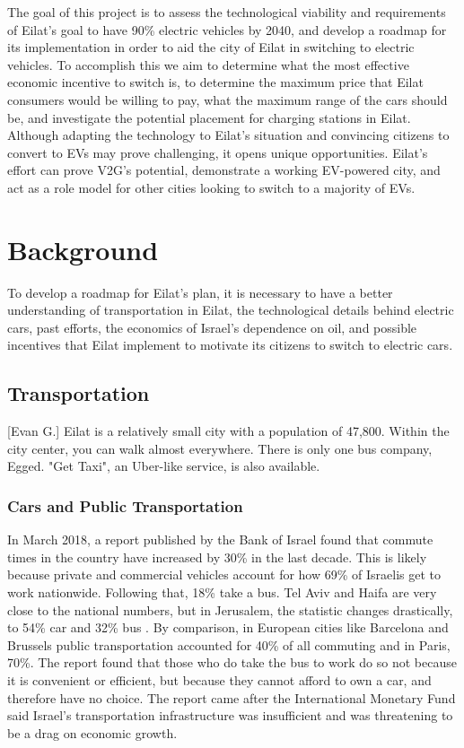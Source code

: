 \documentclass{article}                         %
\begin{document}
The goal of this project is to assess the technological viability and requirements of Eilat's goal to have 90\% electric vehicles by 2040, and develop a roadmap for its implementation in order to aid the city of Eilat in switching to electric vehicles. To accomplish this we aim to determine what the most effective economic incentive to switch is, to determine the maximum price that Eilat consumers would be willing to pay, what the maximum range of the cars should be, and investigate the potential placement for charging stations in Eilat. Although adapting the technology to Eilat's situation and convincing citizens to convert to EVs may prove challenging, it opens unique opportunities. Eilat's effort can prove V2G's potential, demonstrate a working EV-powered city, and act as a role model for other cities looking to switch to a majority of EVs.

\newpage
\section{Background}
To develop a roadmap for Eilat's plan, it is necessary to have a better understanding of transportation in Eilat, the technological details behind electric cars, past efforts, the economics of Israel's dependence on oil, and possible incentives that Eilat implement to motivate its citizens to switch to electric cars.

\subsection{Transportation}[Evan G.]
Eilat is a relatively small city with a population of 47,800. Within the city center, you can walk almost everywhere. There is only one bus company, Egged. \cite{TransportationEilat} "Get Taxi", an Uber-like service, is also available. 

\subsubsection{Cars and Public Transportation}
In March 2018, a report published by the Bank of Israel found that commute times in the country have increased by 30\% in the last decade. This is likely because private and commercial vehicles account for how 69\% of Israelis get to work nationwide. Following that, 18\% take a bus. Tel Aviv and Haifa are very close to the national numbers, but in Jerusalem, the statistic changes drastically, to 54\% car and 32\% bus \cite{Dori2018IsraeliRoads}. By comparison, in European cities like Barcelona and Brussels public transportation accounted for 40\% of all commuting and in Paris, 70\%. The report found that those who do take the bus to work do so not because it is convenient or efficient, but because they cannot afford to own a car, and therefore have no choice. The report came after the International Monetary Fund said Israel’s transportation infrastructure was insufficient and was threatening to be a drag on economic growth. 
\end{document}
